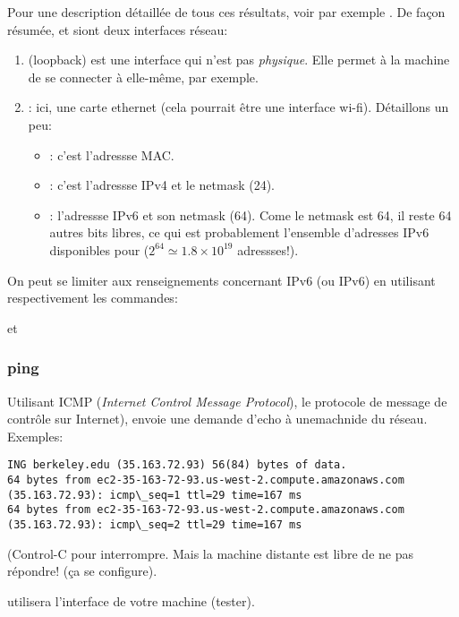 Pour une description détaillée de tous ces résultats, voir par exemple
\cite{comip}.  De façon résumée,  et  siont deux
interfaces réseau:
\begin{enumerate}
  \item {} (loopback) est une interface qui n'est pas
    \emph{physique}. Elle permet à la machine de se connecter à
    elle-même, par exemple.
  \item {}: ici, une carte ethernet (cela pourrait être une
    interface wi-fi). Détaillons un peu:
    \begin{itemize}
      \item {}:
        c'est l'adressse MAC.
      \item {}: c'est l'adressse IPv4 et le
        netmask (24).
      \item {}: l'adressse IPv6
        et son netmask (64). Come le netmask est 64, il reste 64
        autres bits libres, ce qui est probablement l'ensemble
        d'adresses IPv6 disponibles pour  ($2^{64} \simeq
        1.8 \times 10^{19}$ adressses!).
    \end{itemize}
\end{enumerate}

On peut se limiter aux renseignements concernant IPv6 (ou IPv6) en
utilisant respectivement les commandes:

 et 
\subsubsection{ping}
Utilisant ICMP (\emph{Internet Control Message Protocol}), le
protocole de message de contrôle sur Internet),   envoie une
demande d'echo à unemachnide du réseau. Exemples:

\begin{verbatim}
ING berkeley.edu (35.163.72.93) 56(84) bytes of data.
64 bytes from ec2-35-163-72-93.us-west-2.compute.amazonaws.com (35.163.72.93): icmp\_seq=1 ttl=29 time=167 ms
64 bytes from ec2-35-163-72-93.us-west-2.compute.amazonaws.com (35.163.72.93): icmp\_seq=2 ttl=29 time=167 ms
\end{verbatim}
(Control-C pour interrompre. Mais la machine distante est libre de ne
pas répondre! (ça se configure).

 utilisera l'interface  de votre machine
(tester).
